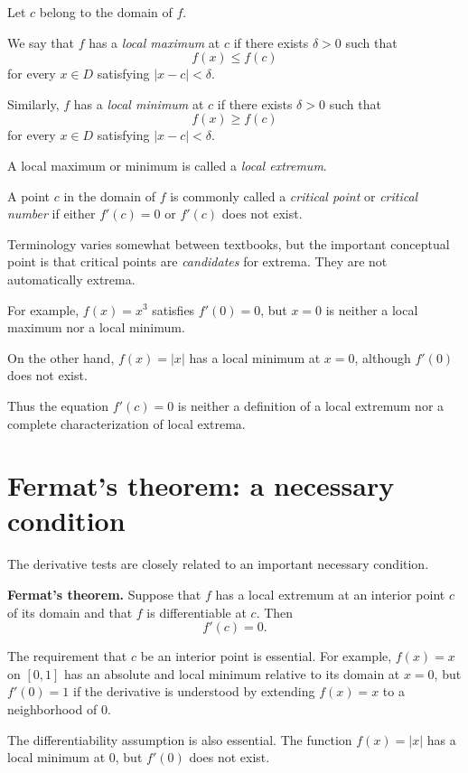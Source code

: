 \documentclass{essay}
\begin{document}
Let \(c\) belong to the domain of \(f\).

We say that \(f\) has a \emph{local maximum} at \(c\) if there exists \(\delta>0\) such that
\[
f(x)\leq f(c)
\]
for every \(x\in D\) satisfying \(|x-c|<\delta\).

Similarly, \(f\) has a \emph{local minimum} at \(c\) if there exists \(\delta>0\) such that
\[
f(x)\geq f(c)
\]
for every \(x\in D\) satisfying \(|x-c|<\delta\).

A local maximum or minimum is called a \emph{local extremum}.

A point \(c\) in the domain of \(f\) is commonly called a \emph{critical point} or \emph{critical number} if either \(f'(c)=0\) or \(f'(c)\) does not exist.

Terminology varies somewhat between textbooks, but the important conceptual point is that critical points are \emph{candidates} for extrema. They are not automatically extrema.

For example, \(f(x)=x^3\) satisfies \(f'(0)=0\), but \(x=0\) is neither a local maximum nor a local minimum.

On the other hand, \(f(x)=|x|\) has a local minimum at \(x=0\), although \(f'(0)\) does not exist.

Thus the equation \(f'(c)=0\) is neither a definition of a local extremum nor a complete characterization of local extrema.

\section{Fermat's theorem: a necessary condition}

The derivative tests are closely related to an important necessary condition.

\medskip

\noindent
\textbf{Fermat's theorem.}
Suppose that \(f\) has a local extremum at an interior point \(c\) of its domain and that \(f\) is differentiable at \(c\). Then
\[
f'(c)=0.
\]

\medskip

The requirement that \(c\) be an interior point is essential. For example, \(f(x)=x\) on \([0,1]\) has an absolute and local minimum relative to its domain at \(x=0\), but \(f'(0)=1\) if the derivative is understood by extending \(f(x)=x\) to a neighborhood of \(0\).

The differentiability assumption is also essential. The function \(f(x)=|x|\) has a local minimum at \(0\), but \(f'(0)\) does not exist.
\end{document}
